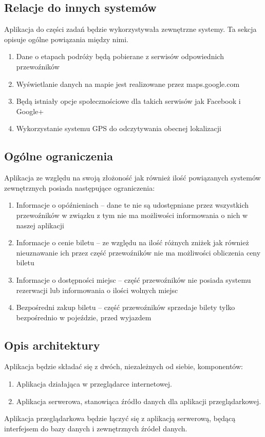 \documentclass[12pt,a4paper]{report}
\begin{document}
\subsection{Relacje do innych systemów}
	Aplikacja do części zadań będzie wykorzystywała zewnętrzne systemy. Ta sekcja opisuje ogólne powiązania między nimi.
\begin{enumerate}
	\item Dane o etapach podróży będą pobierane z serwisów odpowiednich przewoźników
	\item Wyświetlanie danych na mapie jest realizowane przez maps.google.com
	\item Będą istniały opcje społecznościowe dla takich serwisów jak Facebook i Google+
	\item Wykorzystanie systemu GPS do odczytywania obecnej lokalizacji
\end{enumerate}
\subsection{Ogólne ograniczenia}
	Aplikacja ze względu na swoją złożoność jak również ilość powiązanych systemów zewnętrznych posiada następujące ograniczenia:	
\begin{enumerate}
	\item Informacje o opóźnieniach -- dane te nie są udostępniane przez wszystkich przewoźników w związku z tym nie ma możliwości informowania o nich w naszej aplikacji
	\item Informacje o cenie biletu -- ze względu na ilość różnych zniżek jak również nieuznawanie ich przez część przewoźników nie ma możliwości obliczenia ceny biletu
	\item Informacje o dostępności miejsc -- część przewoźników nie posiada systemu rezerwacji lub informowania o ilości wolnych miejsc
	\item Bezpośredni zakup biletu -- część przewoźników sprzedaje bilety tylko bezpośrednio w pojeździe, przed wyjazdem
\end{enumerate}
\subsection{Opis architektury}
Aplikacja będzie składać się z dwóch, niezależnych od siebie, komponentów:
\begin{enumerate}
	\item Aplikacja działająca w przeglądarce internetowej.
	\item Aplikacja serwerowa, stanowiąca źródło danych dla aplikacji przeglądarkowej.
\end{enumerate} 
	Aplikacja przeglądarkowa będzie łączyć się z aplikacją serwerową, będącą interfejsem do bazy danych i zewnętrznych źródeł danych.
\end{document}
